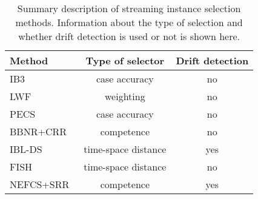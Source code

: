 \documentclass[preprint,12pt]{elsarticle}
\begin{document}
\begin{table}[!htp]
\renewcommand{\arraystretch}{1.3}
\centering
\scriptsize
\caption{Summary description of streaming instance selection methods. Information about the type of selection and whether drift detection is used or not is shown here.}
\label{tab:fs}
\begin{tabular}{ lcc }
\toprule
{\bf Method} & {\bf Type of selector} & {\bf Drift detection}\\
\midrule
IB3~\cite{aha91} & case accuracy & no\\
LWF~\cite{salga93} & weighting & no\\
PECS~\cite{salga97} & case accuracy & no\\
BBNR+CRR~\cite{masud10} & competence & no\\
IBL-DS~\cite{berin07} & time-space distance & yes\\
FISH~\cite{gomes14} & time-space distance & no\\
NEFCS+SRR~\cite{lu16} & competence & yes\\
\bottomrule
\end{tabular}
\end{table}
\end{document}
